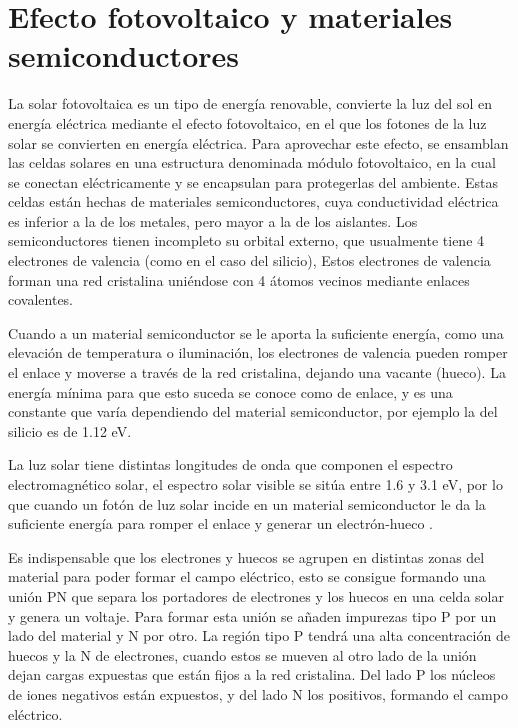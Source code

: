 \section{Efecto fotovoltaico y materiales semiconductores}
\label{sec:efectofoto}

La solar fotovoltaica es un tipo de energía renovable, convierte la luz del sol en energía eléctrica mediante el efecto fotovoltaico, en el que los fotones de la luz solar se convierten en energía eléctrica. Para aprovechar este efecto, se ensamblan las celdas solares en una estructura denominada módulo fotovoltaico, en la cual se conectan eléctricamente y se encapsulan para protegerlas del ambiente. Estas celdas están hechas de materiales semiconductores, cuya conductividad eléctrica es inferior a la de los metales, pero mayor a la de los aislantes. Los semiconductores tienen incompleto su orbital externo, que usualmente tiene 4 electrones de valencia (como en el caso del silicio), Estos electrones de valencia forman una red cristalina uniéndose con 4 átomos vecinos mediante enlaces covalentes. 

Cuando a un material semiconductor se le aporta la suficiente energía, como una elevación de temperatura o iluminación, los electrones de valencia pueden romper el enlace y moverse a través de la red cristalina, dejando una vacante (hueco). La energía mínima para que esto suceda se conoce como de enlace, y es una constante que varía dependiendo del material semiconductor, por ejemplo la del silicio es de 1.12 eV.

La luz solar tiene distintas longitudes de onda que componen el espectro electromagnético solar, el espectro solar visible se sitúa entre 1.6 y 3.1 eV, por lo que cuando un fotón de luz solar incide en un material semiconductor le da la suficiente energía para romper el enlace y generar un electrón-hueco \citep{Mesa2009}. 

Es indispensable que los electrones y huecos se agrupen en distintas zonas del material para poder formar el campo eléctrico, esto se consigue formando una unión PN que separa los portadores de electrones y los huecos en una celda solar y genera un voltaje. Para formar esta unión se añaden impurezas tipo P por un lado del material y N por otro. La región tipo P tendrá una alta concentración de huecos y la N de electrones, cuando estos se mueven al otro lado de la unión dejan cargas expuestas que están fijos a la red cristalina. Del lado P los núcleos de iones negativos están expuestos, y del lado N los positivos, formando el campo eléctrico. 

